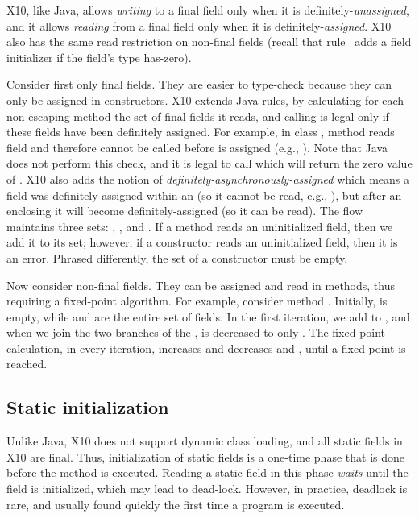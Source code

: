 X10, like Java, allows \emph{writing} to a final field only when it is definitely-\emph{unassigned},
    and it allows \emph{reading} from a final field only when it is definitely-\emph{assigned}.
X10 also has the same read restriction on non-final fields
    (recall that rule~ adds a field initializer if the field's type has-zero).


Consider first only final fields.
    They are easier to type-check because they can only be assigned in constructors.
X10 extends Java rules,
    by calculating for each non-escaping method  the set of final fields it reads,
    and calling  is legal only if these fields have been definitely assigned.
For example, in class , method  reads field 
    and therefore cannot be called before  is assigned (e.g., ).
Note that Java does not perform this check, and it is legal to call 
    which will return the zero value of .
X10 also adds the notion of \emph{definitely-asynchronously-assigned}
    which means a field was definitely-assigned within an 
    (so it cannot be read, e.g., ),
    but after an enclosing  it will become definitely-assigned
    (so it can be read).
The flow maintains three sets:
    , , and .
If a method reads an uninitialized field, then we add it to its  set;
    however, if a constructor reads an uninitialized field, then it is an error.
Phrased differently, the  set of a constructor must be empty.

Now consider non-final fields.
    They can be assigned and read in methods,
        thus requiring a fixed-point algorithm.
For example, consider method .
Initially,  is empty,
    while  and  are the entire set of fields.
In the first iteration, we add  to ,
    and when we join the two branches of the ,
     is decreased to only .
The fixed-point calculation, in every iteration, increases 
    and decreases  and ,
    until a fixed-point is reached.


\subsection{Static initialization}
Unlike Java, X10 does not support dynamic class loading,
    and all static fields in X10 are final.
Thus, initialization of static fields is a one-time phase %
    that is done before the  method is executed.
Reading a static field in this phase \emph{waits} until the field is initialized,
    which may lead to dead-lock.
However, in practice, deadlock is rare,
    and usually found quickly the first time a program is executed.


